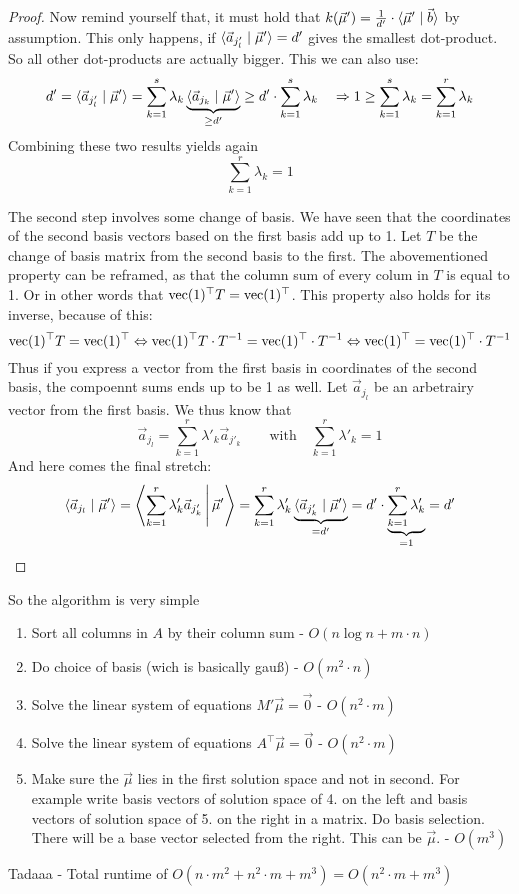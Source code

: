 \begin{proof}
    Now remind yourself that, it must hold that $k(\vec \mu') = \frac{1}{d'}\cdot\langle \vec{\mu}' \mid \vec b \rangle$ by assumption. This only happens, if $\langle \vec a_{j'_l} \mid \vec\mu' \rangle = d'$ gives the smallest dot-product. So all other dot-products are actually bigger. This we can also use:
    $$d' = \langle \vec a_{j'_l} \mid \vec\mu' \rangle = \sum_{k=1}^{s}\lambda_k\underbrace{\langle \vec a_{j_k} \mid \vec\mu' \rangle}_{\geq d'} \geq d'\cdot \sum_{k=1}^{s}\lambda_k \quad\Rightarrow 1 \geq \sum_{k=1}^{s}\lambda_k = \sum_{k=1}^{r}\lambda_k$$
    Combining these two results yields again
    $$\sum_{k=1}^{r}\lambda_k = 1$$

    The second step involves some change of basis. We have seen that the coordinates of the second basis vectors based on the first basis add up to 1. Let $T$ be the change of basis matrix from the second basis to the first. The abovementioned property can be reframed, as that the column sum of every colum in $T$ is equal to 1. Or in other words that $\operatorname{vec}(1)^\top T = \operatorname{vec}(1)^\top$. This property also holds for its inverse, because of this:
    $$\operatorname{vec}(1)^\top T = \operatorname{vec}(1)^\top \Leftrightarrow \operatorname{vec}(1)^\top T\cdot T^{-1} = \operatorname{vec}(1)^\top\cdot T^{-1} \Leftrightarrow \operatorname{vec}(1)^\top = \operatorname{vec}(1)^\top\cdot T^{-1}$$
    Thus if you express a vector from the first basis in coordinates of the second basis, the compoennt sums ends up to be 1 as well. Let $\vec a_{j_l}$ be an arbetrairy vector from the first basis. We thus know that
    $$\vec a_{j_l} = \sum_{k=1}^{r}\lambda'_k \vec a_{j'_k} \qquad \textrm{with}\quad \sum_{k=1}^{r}\lambda'_k = 1$$
    And here comes the final stretch:
    $$\langle \vec a_{j_l} \mid \vec\mu' \rangle = \left\langle \sum_{k=1}^{r}\lambda'_k \vec a_{j'_k} \,\middle|\, \vec\mu' \right\rangle = \sum_{k=1}^{r} \lambda'_k \underbrace{\langle \vec a_{j'_k} \mid \vec\mu' \rangle}_{=d'} = d' \cdot \underbrace{\sum_{k=1}^{r} \lambda'_k}_{=1} = d'$$
\end{proof}

So the algorithm is very simple
\begin{enumerate}
    \item Sort all columns in $A$ by their column sum - $O(n \log n + m \cdot n)$
    \item Do choice of basis (wich is basically gauß) - $O(m^2 \cdot n)$
    \item Solve the linear system of equations $M'\vec\mu=\vec0$ - $O(n^2 \cdot m)$
    \item Solve the linear system of equations $A^\top\vec\mu=\vec0$ - $O(n^2 \cdot m)$
    \item Make sure the $\vec\mu$ lies in the first solution space and not in second. For example write basis vectors of solution space of 4. on the left and basis vectors of solution space of 5. on the right in a matrix. Do basis selection. There will be a base vector selected from the right. This can be $\vec\mu$. - $O(m^3)$
\end{enumerate}
Tadaaa - Total runtime of $O(n \cdot m^2 + n^2 \cdot m + m^3) = O(n^2 \cdot m + m^3)$


